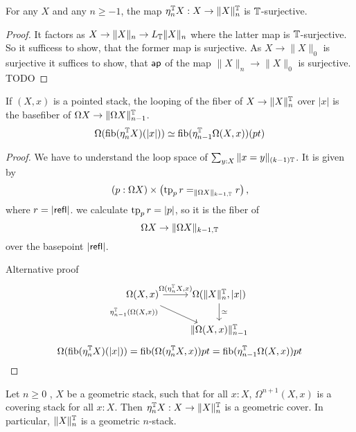 \begin{lemma}
	For any $X$ and any $n \ge -1$, the map $\eta_n^{\mathbb{T}} X : X \to \|X\|_n^{\mathbb{T}}$ is $\mathbb{T}$-surjective.
\end{lemma}
\begin{proof}
	It factors as $X \to \|X\|_n \to L_{\mathbb{T}} \|X\|_n$ where the latter map is $\mathbb{T}$-surjective. So it sufficess to show, that the former map is surjective. As $X \to \|X\|_0$ is surjective it suffices to show, that $\mathsf{ap}$ of the map $\|X\|_n \to \|X\|_0$ is surjective. TODO %
\end{proof}
\begin{lemma}{\label{lemma:loopOfFiber}}
	If $(X,x)$ is a pointed stack, the looping of the fiber of $X \to \|X\|_{n}^{\mathbb{T}}$ over $|x|$ is the basefiber of $\Omega X \to \|\Omega X\|_{n-1}^{\mathbb{T}}$.
	\[
	\Omega (\operatorname{fib}(\eta_n^{\mathbb{T}} X)(|x|)) \simeq \operatorname{fib} (\eta_{n-1}^{\mathbb{T}} \Omega (X,x))(pt)
	\]
\end{lemma}
\begin{proof}
	We have to understand the loop space of $\sum_{y : X} \| x = y\|_{(k-1)\mathbb{T}}$. It is given by
	\[(p : \Omega X) \times \left(\operatorname{tp}_p r =_{\|\Omega X\|_{k-1,\mathbb{T}}} r  \right),\]
	where $ r= |\mathsf{refl}|$.
	we calculate $\operatorname{tp}_p r = |p|$, so it is the fiber of 
	\[
	\Omega X  \to \|\Omega X \|_{k-1, \mathbb{T}}
	\]
	over the basepoint $|\mathsf{refl}|$.
	
	Alternative proof
\[\begin{tikzcd}
	{\Omega (X , x)} & {\Omega (\|X\|_n^\bT , |x|) } \\
	& {\|\Omega (X , x)\|_{n-1}^\bT}
	\arrow["{	\Omega (\eta_n^\bT X , x)}", from=1-1, to=1-2]
	\arrow["{\eta_{n-1}^\bT (\Omega (X,x))}"'{pos=0}, shift right, from=1-1, to=2-2]
	\arrow["{\simeq }", from=1-2, to=2-2]
\end{tikzcd}\]
	\[
		\Omega (\operatorname{fib}(\eta_n^{\mathbb{T}} X)(|x|)) = \operatorname{fib} (\Omega (\eta_n^{\mathbb{T}} X ,x)) pt = \operatorname{fib} (\eta_{n-1}^{\mathbb{T}} \Omega (X ,x)) pt
	\]
\end{proof}
\begin{prop}{\label{prop:LoopingsImplyGerbe}}
	Let $n \ge 0$ , $X$ be a geometric stack, such that for all $x : X$, $\Omega^{n+1} (X , x)$ is a covering stack for all $x : X$. Then $\eta_n^{\mathbb{T}} X : X \to \|X\|_n^{\mathbb{T}}$ is a geometric cover. In particular, $\|X\|_n^{\mathbb{T}}$ is a geometric $n$-stack.
\end{prop}
